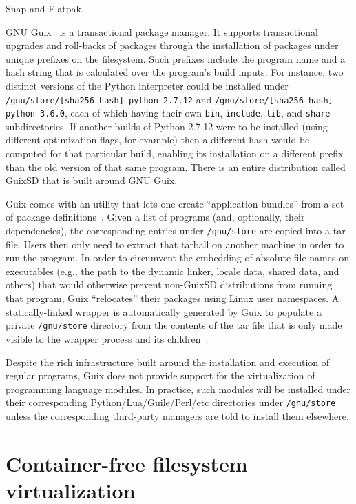 \documentclass[sigplan, anonymous]{acmart}
\begin{document}
Snap and Flatpak.


GNU Guix~\cite{courtes2013guix} is a transactional package manager. It supports transactional upgrades and
roll-backs of packages through the installation of packages under unique prefixes on the filesystem.
Such prefixes include the program name and a hash string that is calculated over the program's
build inputs. For instance, two distinct versions of the Python interpreter could be installed
under \texttt{/gnu/store/[sha256-hash]-python-2.7.12} and \texttt{/gnu/store/[sha256-hash]-python-3.6.0},
each of which having their own \texttt{bin}, \texttt{include}, \texttt{lib}, and \texttt{share}
subdirectories. If another builds of Python 2.7.12 were to be installed (using different optimization
flags, for example) then a different hash would be computed for that particular build, enabling its
installation on a different prefix than the old version of that same program. There is an entire
distribution called GuixSD that is built around GNU Guix.

Guix comes with an utility that lets one create ``application bundles'' from a set of package
definitions~\cite{gnu2017bundles}. Given a list of programs (and, optionally, their dependencies),
the corresponding entries under \texttt{/gnu/store} are copied into a tar file. Users then only
need to extract that tarball on another machine in order to run the program. In order to circumvent
the embedding of absolute file names on executables (e.g., the path to the dynamic linker, locale
data, shared data, and others) that would otherwise prevent non-GuixSD distributions from running
that program, Guix ``relocates'' their packages using Linux user namespaces. A statically-linked
wrapper is automatically generated by Guix to populate a private \texttt{/gnu/store} directory
from the contents of the tar file that is only made visible to the wrapper process and its
children~\cite{gnu2018tarballs}.

Despite the rich infrastructure built around the installation and execution of regular programs,
Guix does not provide support for the virtualization of programming language modules. In practice,
such modules will be installed under their corresponding Python/Lua/Guile/Perl/etc directories
under \texttt{/gnu/store} unless the corresponding third-party managers are told to install them
elsewhere.


\section{Container-free filesystem virtualization}
\end{document}
